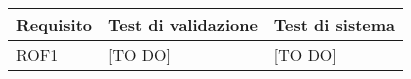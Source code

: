 \begin{center}

\def\arraystretch{1.5}
\bgroup
\begin{longtable}{| p{4cm} | p{4cm} | p{4cm} |}

	\hline
	\textbf{Requisito} & \textbf{Test di validazione} &  \textbf{Test di sistema} \\
	\hline


	ROF1  & [TO DO] & [TO DO] \\
	\hline


\end{longtable}
\egroup
\end{center}